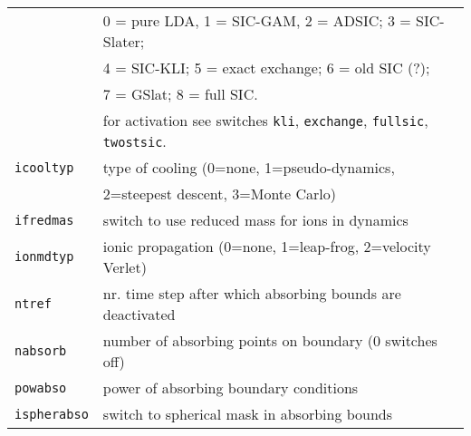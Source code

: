 \documentclass[12pt]{article}
\begin{document}
\begin{tabular}{ll}
    &  0 = pure LDA, 1 = SIC-GAM, 2 = ADSIC; 3 = SIC-Slater; \\
    &  4 = SIC-KLI; 5 = exact exchange; 6 = old SIC (?);\\
    &  7 = GSlat;  8 = full SIC.\\
    & for activation see switches 
     {\tt kli}, {\tt exchange}, {\tt  fullsic}, {\tt twostsic}.\\
{\tt icooltyp         }& type of cooling (0=none, 1=pseudo-dynamics,\\
{\tt                  }& 2=steepest descent, 3=Monte Carlo)\\
{\tt ifredmas         }& switch to use reduced mass for ions in dynamics\\
{\tt ionmdtyp         }& ionic propagation
                         (0=none, 1=leap-frog, 2=velocity Verlet)\\
{\tt ntref}& nr. time step after which absorbing bounds are deactivated
\\
{\tt nabsorb}          & number of absorbing points on boundary (0 switches off) 
\\
{\tt powabso}          & power of absorbing boundary conditions
\\
{\tt ispherabso}       & switch to spherical mask in absorbing bounds
\\
\hline
\end{tabular}
\end{document}
